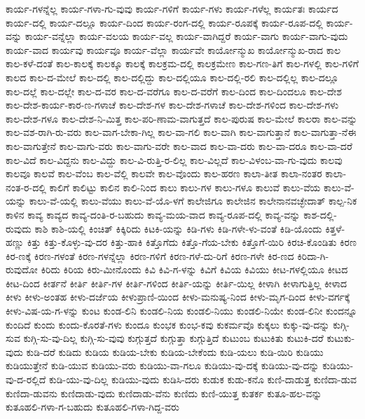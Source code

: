 {ಕಾರ್ಯ-ಗಳನ್ನೆಲ್ಲ
ಕಾರ್ಯ-ಗಳಾ-ಗು-ವುವು
ಕಾರ್ಯ-ಗಳಿಗೆ
ಕಾರ್ಯ-ಗಳು
ಕಾರ್ಯ-ಗಳೆಲ್ಲ
ಕಾರ್ಯತಃ
ಕಾರ್ಯದ
ಕಾರ್ಯ-ದಲ್ಲಿ
ಕಾರ್ಯ-ದಲ್ಲೂ
ಕಾರ್ಯ-ದಿಂದ
ಕಾರ್ಯ-ರಂಗ-ದಲ್ಲಿ
ಕಾರ್ಯ-ರೂಪಕ್ಕೆ
ಕಾರ್ಯ-ರೂಪ-ದಲ್ಲಿ
ಕಾರ್ಯ-ವನ್ನು
ಕಾರ್ಯ-ವನ್ನೆಲ್ಲಾ
ಕಾರ್ಯ-ವಲಯ
ಕಾರ್ಯ-ವಲ್ಲ
ಕಾರ್ಯ-ವಾಗಿದ್ದರೆ
ಕಾರ್ಯ-ವಾಗು
ಕಾರ್ಯ-ವಾಗು-ವುದು
ಕಾರ್ಯ-ವಾದ
ಕಾರ್ಯವು
ಕಾರ್ಯವೂ
ಕಾರ್ಯ-ವೆಲ್ಲಾ
ಕಾರ್ಯವೇ
ಕಾರ್ಯೋನ್ಮುಖ
ಕಾರ್ಯೋನ್ಮುಖ-ರಾದ
ಕಾಲ
ಕಾಲ-ಕಳೆ-ದಂತೆ
ಕಾಲ-ಕಾಲಕ್ಕೆ
ಕಾಲಕ್ಕೂ
ಕಾಲಕ್ಕೆ
ಕಾಲಕ್ರಮ-ದಲ್ಲಿ
ಕಾಲಕ್ರಮೇಣ
ಕಾಲ-ಗಣ-ತಿಗೆ
ಕಾಲ-ಗಳಲ್ಲಿ
ಕಾಲ-ಗಳಿಗೆ
ಕಾಲದ
ಕಾಲ-ದ-ಮೇಲೆ
ಕಾಲ-ದಲ್ಲಿ
ಕಾಲ-ದಲ್ಲಿದ್ದು
ಕಾಲ-ದಲ್ಲಿಯೂ
ಕಾಲ-ದಲ್ಲಿ-ರಲಿ
ಕಾಲ-ದಲ್ಲಿಲ್ಲ
ಕಾಲ-ದಲ್ಲೂ
ಕಾಲ-ದಲ್ಲೆ
ಕಾಲ-ದಲ್ಲೇ
ಕಾಲ-ದ-ವರ
ಕಾಲ-ದ-ವರೆಗೂ
ಕಾಲ-ದ-ವರೆಗೆ
ಕಾಲ-ದಿಂದ
ಕಾಲ-ದಿಂದಲೂ
ಕಾಲ-ದೇಶ
ಕಾಲ-ದೇಶ-ಕಾರ್ಯ-ಕಾರ-ಣ-ಗಳಾಚೆ
ಕಾಲ-ದೇಶ-ಗಳ
ಕಾಲ-ದೇಶ-ಗಳಾಚೆ
ಕಾಲ-ದೇಶ-ಗಳಿಂದ
ಕಾಲ-ದೇಶ-ಗಳು
ಕಾಲ-ದೇಶ-ಗಳೂ
ಕಾಲ-ದೇಶ-ನಿ-ಮಿತ್ತ
ಕಾಲ-ಪರಿ-ಣಾಮ-ವಾಗುತ್ತದೆ
ಕಾಲ-ಪುರುಷ
ಕಾಲ-ಮೇಲೆ
ಕಾಲರಾ
ಕಾಲ-ವನ್ನು
ಕಾಲ-ವಶ-ರಾಗಿ-ರು-ವರು
ಕಾಲ-ವಾಗ-ಬೇಕಾ-ಗಿಲ್ಲ
ಕಾಲ-ವಾ-ಗಲಿ
ಕಾಲ-ವಾಗಿ
ಕಾಲ-ವಾಗುತ್ತಾನೆ
ಕಾಲ-ವಾಗುತ್ತಾ-ನೆಈ
ಕಾಲ-ವಾಗುತ್ತೇನೆ
ಕಾಲ-ವಾಗು-ವರು
ಕಾಲ-ವಾಗು-ವರೇ
ಕಾಲ-ವಾದ
ಕಾಲ-ವಾ-ದರು
ಕಾಲ-ವಾ-ದರೂ
ಕಾಲ-ವಾ-ದರೆ
ಕಾಲ-ವಿದೆ
ಕಾಲ-ವಿದ್ದನು
ಕಾಲ-ವಿದ್ದು
ಕಾಲ-ವಿ-ರುತ್ತಿ-ರ-ಲಿಲ್ಲ
ಕಾಲ-ವಿಲ್ಲದೆ
ಕಾಲ-ವಿಳಂಬ-ವಾ-ಗು-ವುದು
ಕಾಲವು
ಕಾಲವೂ
ಕಾಲವೆ
ಕಾಲ-ವೆಂಬ
ಕಾಲ-ವೆಲ್ಲಿ
ಕಾಲವೇ
ಕಾಲ-ವೊಂದು
ಕಾಲ-ಹರಣ
ಕಾಲಾ-ತೀತ
ಕಾಲಾ-ನಂತರ
ಕಾಲಾ-ನಂತ-ರ-ದಲ್ಲಿ
ಕಾಲಿಗೆ
ಕಾಲಿಟ್ಟು
ಕಾಲಿನ
ಕಾಲಿ-ನಿಂದ
ಕಾಲು
ಕಾಲು-ಗಳ
ಕಾಲು-ಗಳೂ
ಕಾಲುವೆ
ಕಾಲು-ವೆಯ
ಕಾಲು-ವೆ-ಯನ್ನು
ಕಾಲು-ವೆ-ಯಲ್ಲಿ
ಕಾಲು-ವೆಯು
ಕಾಲು-ವೆ-ಯೊ-ಳಗೆ
ಕಾಲೇಜಿಗೂ
ಕಾಲೇಜಿನ
ಕಾಲೇನಾನವಚ್ಛೇದಾತ್
ಕಾಲ್ಪ-ನಿಕ
ಕಾಳಿನ
ಕಾವ್ಯ
ಕಾವ್ಯದ
ಕಾವ್ಯ-ದಂತಿ-ರ-ಬಹುದು
ಕಾವ್ಯ-ಮಯ-ವಾದ
ಕಾವ್ಯ-ರೂಪ-ದಲ್ಲಿ
ಕಾವ್ಯ-ವನ್ನು
ಕಾಶ-ದಲ್ಲಿ-ರುವುದು
ಕಾಶಿ
ಕಾಶಿ-ಯಲ್ಲಿ
ಕಿಂಚಿತ್
ಕಿಕ್ಕಿರಿದು
ಕಿಟಕಿ-ಯನ್ನು
ಕಿಡಿ-ಗಳು
ಕಿಡಿ-ಗಳೇ-ಳು-ವಂತೆ
ಕಿಡಿ-ಯೊಂದು
ಕಿತ್ತಳೆ-ಹಣ್ಣು
ಕಿತ್ತು
ಕಿತ್ತು-ಕೊಳ್ಳು-ವು-ದರ
ಕಿತ್ತು-ಹಾಕಿ
ಕಿತ್ತೊಗೆದು
ಕಿತ್ತೊ-ಗೆಯ-ಬೇಕು
ಕಿತ್ತೊಗೆ-ಯಿರಿ
ಕಿರಚಿ-ಕೊಂಡಿತು
ಕಿರಣ
ಕಿರ-ಣಕ್ಕೆ
ಕಿರಣ-ಗಳಂತೆ
ಕಿರಣ-ಗಳನ್ನೆಲ್ಲಾ
ಕಿರಣ-ಗಳಿಗೆ
ಕಿರಣ-ಗಳೆ-ದು-ರಿಗೆ
ಕಿರಣ-ಗಳೇ
ಕಿರ-ಣದ
ಕಿರಿದಾ-ಗಿ-ರುವುದೋ
ಕಿರಿದು
ಕಿರಿಯ
ಕಿರು-ಮೀನೊಂದು
ಕಿವಿ
ಕಿವಿ-ಗ-ಳನ್ನು
ಕಿವಿಗೆ
ಕಿವಿಯ
ಕಿವಿಯು
ಕೀಟ-ಗಳಲ್ಲಿಯೂ
ಕೀಟದ
ಕೀಟ-ದಿಂದ
ಕೀರ್ತನೆ
ಕೀರ್ತಿ
ಕೀರ್ತಿ-ಗಳ
ಕೀರ್ತಿ-ಗಳಿಂದ
ಕೀರ್ತಿ-ಯನ್ನು
ಕೀರ್ತಿ-ಯಿಲ್ಲ
ಕೀಳಾಗಿ
ಕೀಳಾಗುತ್ತಿಲ್ಲ
ಕೀಳಾದ
ಕೀಳು
ಕೀಳು-ಅಂತಹ
ಕೀಳು-ದರ್ಜೆಯ
ಕೀಳುಪ್ರಾಣಿ-ಯಿಂದ
ಕೀಳು-ಮನುಷ್ಯ-ನಿಂದ
ಕೀಳು-ಮೃಗ-ದಿಂದ
ಕೀಳು-ವರ್ಗಕ್ಕೆ
ಕೀಳು-ವಿಷ-ಯ-ಗ-ಳನ್ನು
ಕುಂಟ
ಕುಂಡ-ಲಿನಿ
ಕುಂಡಲಿ-ನಿಯ
ಕುಂಡಲಿ-ನಿಯು
ಕುಂಡಲಿ-ನಿಯೇ
ಕುಂಡ-ಲಿನೀ
ಕುಂದನ್ನೂ
ಕುಂದಿದೆ
ಕುಂದು
ಕುಂದು-ಕೊರತೆ-ಗಳು
ಕುಂದೂ
ಕುಂಭಕ
ಕುಂಭ-ಕವು
ಕುಕರ್ಮವೊ
ಕುಕ್ಕಲು
ಕುಕ್ಕು-ವು-ದನ್ನು
ಕುಗ್ಗಿ-ಸುವ
ಕುಗ್ಗಿ-ಸು-ವು-ದಿಲ್ಲ
ಕುಗ್ಗಿ-ಸು-ವುವು
ಕುಗ್ಗುತ್ತದೆ
ಕುಗ್ಗುತ್ತಾ
ಕುಗ್ಗುತ್ತಿದೆ
ಕುಟುಂಬ
ಕುಟುಕಿತು
ಕುಟುಕಿ-ದರೆ
ಕುಟುಕು-ವುದು
ಕುಡಿ-ದರೆ
ಕುಡಿದು
ಕುಡಿಯ
ಕುಡಿಯ-ಬೇಕು
ಕುಡಿಯ-ಬೇಕೆಂದು
ಕುಡಿ-ಯಲು
ಕುಡಿ-ಯಿರಿ
ಕುಡಿಯು
ಕುಡಿಯುತ್ತೇನೆ
ಕುಡಿ-ಯುವ
ಕುಡಿಯು-ವರು
ಕುಡಿಯು-ವಾ-ಗಲೂ
ಕುಡಿಯು-ವು-ದಕ್ಕೆ
ಕುಡಿಯು-ವು-ದನ್ನು
ಕುಡಿಯು-ವು-ದ-ರಲ್ಲಿದೆ
ಕುಡಿ-ಯು-ವು-ದಿಲ್ಲ
ಕುಡಿಯು-ವುದು
ಕುಡಿಸಿ-ದರು
ಕುಡುಕ
ಕುಡು-ಕನೊ
ಕುಣಿ-ದಾಡುತ್ತ
ಕುಣಿದಾ-ಡುವ
ಕುಣಿದಾ-ಡುವನು
ಕುಣಿದಾಡು-ವುದು
ಕುಣಿದಾಡು-ವೆನು
ಕುಣಿದು
ಕುಣಿ-ಯುತ್ತ
ಕುತರ್ಕ
ಕುತೂ-ಹಲ-ವನ್ನು
ಕುತೂಹಲಿ-ಗಳಾ-ಗ-ಬಹುದು
ಕುತೂಹಲಿ-ಗಳಾ-ಗಿದ್ದ-ವರು
}
